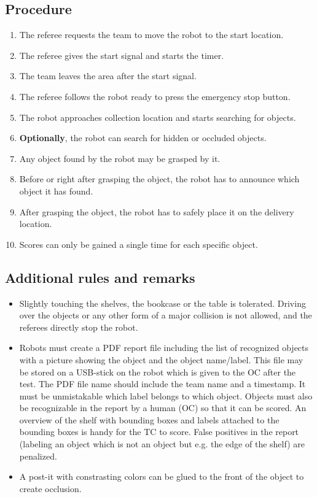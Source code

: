 \subsection*{Procedure}
	\begin{enumerate}[nosep]
		\item The referee requests the team to move the robot to the start location.
		\item The referee gives the start signal and starts the timer.
		\item The team leaves the area after the start signal.		
		\item The referee follows the robot ready to press the emergency stop button.
		
		\item The robot approaches collection location and starts searching for objects.
		\item \textbf{Optionally}, the robot can search for hidden or occluded objects.
		\item Any object found by the robot may be grasped by it. 
		\item Before or right after grasping the object, the robot has to announce which object it has found.
		\item After grasping the object, the robot has to safely place it on the delivery location.
		\item Scores can only be gained a single time for each specific object.
		
	\end{enumerate}





\subsection*{Additional rules and remarks}
\begin{itemize}[nosep]
	\item Slightly touching the shelves, the bookcase or the table is tolerated. Driving over the objects or any other form of a major collision is not allowed, and the referees directly stop the robot.
	\item Robots must create a PDF report file including the list of recognized objects with a picture showing the object and the object name/label. This file may be stored on a USB-stick on the robot which is given to the OC after the test. The PDF file name should include the team name and a timestamp. It must be unmistakable which label belongs to which object. Objects must also be recognizable in the report by a human (OC) so that it can be scored. An overview of the shelf with bounding boxes and labels attached to the bounding boxes is handy for the TC to score. False positives in the report (labeling an object which is not an object but e.g. the edge of the shelf) are penalized.
	\item A post-it with constrasting colors can be glued to the front of the object to create occlusion.
\end{itemize}

